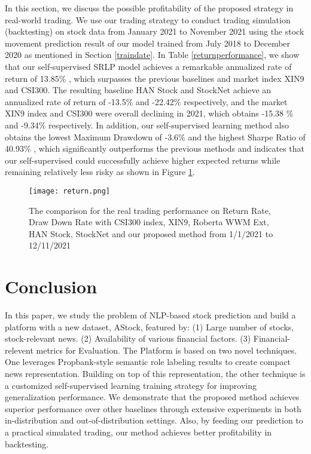 \documentclass{article}
\begin{document}
In this section, we discuss the possible profitability of the proposed strategy in real-world trading.  We use our trading strategy to conduct trading simulation (backtesting) on stock data from January 2021 to November 2021 using the stock movement prediction result of our model trained from July 2018 to December 2020 as mentioned in Section \ref{traindate}.  In Table \ref{returnperformance}, we show that our self-supervised SRLP model achieves a remarkable annualized rate of return of 13.85\% , which surpasses the previous baselines and market index XIN9 and CSI300.  The resulting baseline HAN Stock \cite{hu2018listening} and StockNet \cite{xu-cohen-2018-stock} achieve an annualized rate of return of -13.5\% and -22.42\% respectively, and the market XIN9 index and CSI300 were overall declining in 2021, which obtains -15.38 \% and -9.34\% respectively.  In addition, our self-supervised learning method also obtains the lowest Maximum Drawdown of -3.6\% and the highest Sharpe Ratio of 40.93\% , which significantly 
outperforms the previous methods and indicates that our self-supervised could successfully achieve higher expected returns while remaining relatively less risky as shown in Figure \ref{return}. 







\begin{figure}[]
\begin{center}  
  \texttt{[image: return.png]}
\end{center}
\caption{The comparison for the real trading performance on Return Rate, Draw Down Rate with  CSI300 index, XIN9, Roberta WWM Ext, HAN Stock, StockNet and our proposed method from 1/1/2021 to 12/11/2021}
\label{return}
\end{figure}
\section{Conclusion}




In this paper, we study the problem of NLP-based stock prediction and build a platform with a new dataset, AStock, featured by: (1) Large number of stocks, stock-relevant news. (2) Availability of various financial factors. (3) Financial-relevent metrics for Evaluation. The Platform is based on two novel techniques. One leverages Propbank-style semantic role labeling results to create compact news representation. Building on top of this representation, the other technique is a customized self-supervised learning training strategy for improving generalization performance. We demonstrate that the proposed method achieves superior performance over other baselines through extensive experiments in both in-distribution and out-of-distribution settings. Also, by feeding our prediction to a practical simulated trading, our method achieves better profitability in backtesting.





\end{document}
